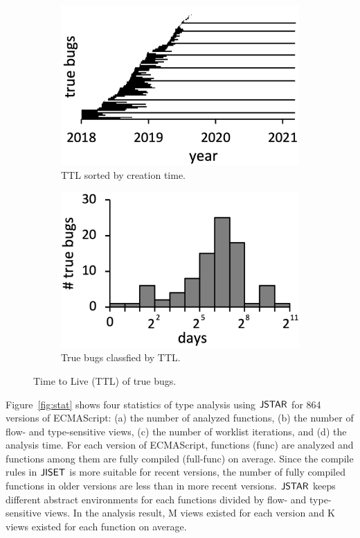\begin{figure}
  \centering
  \begin{subfigure}[b]{0.24\textwidth}
    \includegraphics[width=\textwidth]{img/ttl-chro}
    \caption{TTL sorted by creation time.}
  \end{subfigure}
  \begin{subfigure}[b]{0.24\textwidth}
    \includegraphics[width=\textwidth]{img/ttl-count}
    \caption{True bugs classfied by TTL.}
  \end{subfigure}
  \caption{Time to Live (TTL) of true bugs.}
  \vspace*{-1.5em}
  \label{fig:ttl}
\end{figure}

Figure~\ref{fig:stat} shows four statistics of type analysis using $\tool$ for
864 versions of ECMAScript: (a) the number of analyzed functions, (b) the number
of flow- and type-sensitive views, (c) the number of worklist iterations, and
(d) the analysis time.  For each version of ECMAScript, 
functions (\textsf{func}) are analyzed and  functions among them
are fully compiled (\textsf{full-func}) on average.  Since the compile rules in
$\jiset$ is more suitable for recent versions, the number of fully compiled
functions in older versions are less than in more recent versions.  $\tool$
keeps different abstract environments for each functions divided by flow- and
type-sensitive views.  In the analysis result, M views existed for
each version and K views existed for each function on average.

